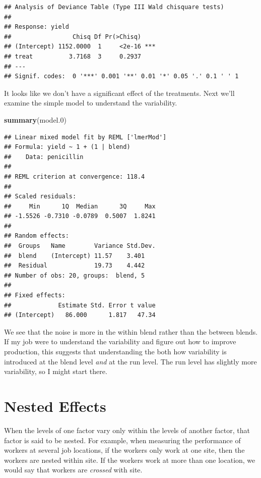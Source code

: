 \documentclass[]{book}
\newenvironment{Shaded}{\begin{snugshade}}{\end{snugshade}}
\newcommand{\KeywordTok}[1]{\textcolor[rgb]{0.13,0.29,0.53}{\textbf{{#1}}}}
\newcommand{\FloatTok}[1]{\textcolor[rgb]{0.00,0.00,0.81}{{#1}}}
\newcommand{\NormalTok}[1]{{#1}}
\theoremstyle{definition}
\theoremstyle{definition}
\theoremstyle{remark}
\begin{document}
\begin{verbatim}
## Analysis of Deviance Table (Type III Wald chisquare tests)
## 
## Response: yield
##                 Chisq Df Pr(>Chisq)    
## (Intercept) 1152.0000  1     <2e-16 ***
## treat          3.7168  3     0.2937    
## ---
## Signif. codes:  0 '***' 0.001 '**' 0.01 '*' 0.05 '.' 0.1 ' ' 1
\end{verbatim}

It looks like we don't have a significant effect of the treatments. Next
we'll examine the simple model to understand the variability.

\begin{Shaded}
\begin{Highlighting}[]
\KeywordTok{summary}\NormalTok{(model}\FloatTok{.0}\NormalTok{)}
\end{Highlighting}
\end{Shaded}

\begin{verbatim}
## Linear mixed model fit by REML ['lmerMod']
## Formula: yield ~ 1 + (1 | blend)
##    Data: penicillin
## 
## REML criterion at convergence: 118.4
## 
## Scaled residuals: 
##     Min      1Q  Median      3Q     Max 
## -1.5526 -0.7310 -0.0789  0.5007  1.8241 
## 
## Random effects:
##  Groups   Name        Variance Std.Dev.
##  blend    (Intercept) 11.57    3.401   
##  Residual             19.73    4.442   
## Number of obs: 20, groups:  blend, 5
## 
## Fixed effects:
##             Estimate Std. Error t value
## (Intercept)   86.000      1.817   47.34
\end{verbatim}

We see that the noise is more in the within blend rather than the
between blends. If my job were to understand the variability and figure
out how to improve production, this suggests that understanding the both
how variability is introduced at the blend level \emph{and} at the run
level. The run level has slightly more variability, so I might start
there.

\section{Nested Effects}\label{nested-effects}

When the levels of one factor vary only within the levels of another
factor, that factor is said to be nested. For example, when measuring
the performance of workers at several job locations, if the workers only
work at one site, then the workers are nested within site. If the
workers work at more than one location, we would say that workers are
\emph{crossed} with site.
\end{document}
